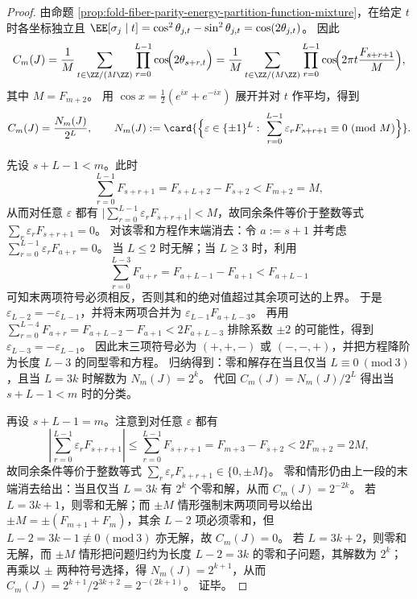 \begin{proof}
由命题 \ref{prop:fold-fiber-parity-energy-partition-function-mixture}，在给定 \(t\) 时各坐标独立且
\(
\EE[\sigma_j\mid t]=\cos^2\theta_{j,t}-\sin^2\theta_{j,t}=\cos(2\theta_{j,t})
\)。
因此
\[
C_m(J)
=\frac1M\sum_{t\in\ZZ/(M\ZZ)}\prod_{r=0}^{L-1}\cos\!\Bigl(2\theta_{s+r,t}\Bigr)
=\frac1M\sum_{t\in\ZZ/(M\ZZ)}\prod_{r=0}^{L-1}\cos\!\Bigl(2\pi t\frac{F_{s+r+1}}{M}\Bigr),
\]
其中 \(M=F_{m+2}\)。
用 \(\cos x=\frac12(e^{ix}+e^{-ix})\) 展开并对 \(t\) 作平均，得到
\[
C_m(J)=\frac{N_m(J)}{2^L},
\qquad
N_m(J):=
\card{\Bigl\{\varepsilon\in\{\pm1\}^{L}:\ \sum_{r=0}^{L-1}\varepsilon_rF_{s+r+1}\equiv 0\ (\mathrm{mod}\ M)\Bigr\}}.
\]

先设 \(s+L-1<m\)。此时
\[
\sum_{r=0}^{L-1}F_{s+r+1}=F_{s+L+2}-F_{s+2}<F_{m+2}=M,
\]
从而对任意 \(\varepsilon\) 都有
\(
\bigl|\sum_{r=0}^{L-1}\varepsilon_rF_{s+r+1}\bigr|<M
\)，故同余条件等价于整数等式 \(\sum_r\varepsilon_rF_{s+r+1}=0\)。
对该零和方程作末端消去：令 \(a:=s+1\) 并考虑
\(
\sum_{r=0}^{L-1}\varepsilon_rF_{a+r}=0
\)。
当 \(L\le 2\) 时无解；当 \(L\ge 3\) 时，利用
\[
\sum_{r=0}^{L-3}F_{a+r}=F_{a+L-1}-F_{a+1}<F_{a+L-1}
\]
可知末两项符号必须相反，否则其和的绝对值超过其余项可达的上界。
于是 \(\varepsilon_{L-2}=-\varepsilon_{L-1}\)，并将末两项合并为 \(\varepsilon_{L-1}F_{a+L-3}\)。
再用
\(
\sum_{r=0}^{L-4}F_{a+r}=F_{a+L-2}-F_{a+1}<2F_{a+L-3}
\)
排除系数 \(\pm2\) 的可能性，得到 \(\varepsilon_{L-3}=-\varepsilon_{L-1}\)。
因此末三项符号必为 \((+,+,-)\) 或 \((-,-,+)\)，并把方程降阶为长度 \(L-3\) 的同型零和方程。
归纳得到：零和解存在当且仅当 \(L\equiv 0\ (\mathrm{mod}\ 3)\)，且当 \(L=3k\) 时解数为 \(N_m(J)=2^k\)。
代回 \(C_m(J)=N_m(J)/2^L\) 得出当 \(s+L-1<m\) 时的分类。

再设 \(s+L-1=m\)。注意到对任意 \(\varepsilon\) 都有
\[
\left|\sum_{r=0}^{L-1}\varepsilon_rF_{s+r+1}\right|
\le \sum_{r=0}^{L-1}F_{s+r+1}
=F_{m+3}-F_{s+2}
<2F_{m+2}=2M,
\]
故同余条件等价于整数等式
\(
\sum_r\varepsilon_rF_{s+r+1}\in\{0,\pm M\}
\)。
零和情形仍由上一段的末端消去给出：当且仅当 \(L=3k\) 有 \(2^k\) 个零和解，从而 \(C_m(J)=2^{-2k}\)。
若 \(L=3k+1\)，则零和无解；而 \(\pm M\) 情形强制末两项同号以给出
\(
\pm M=\pm(F_{m+1}+F_m)
\)，其余 \(L-2\) 项必须零和，但 \(L-2=3k-1\not\equiv 0\ (\mathrm{mod}\ 3)\) 亦无解，故 \(C_m(J)=0\)。
若 \(L=3k+2\)，则零和无解，而 \(\pm M\) 情形把问题归约为长度 \(L-2=3k\) 的零和子问题，其解数为 \(2^k\)；再乘以 \(\pm\) 两种符号选择，得 \(N_m(J)=2^{k+1}\)，从而
\(
C_m(J)=2^{k+1}/2^{3k+2}=2^{-(2k+1)}
\)。
证毕。
\end{proof}


